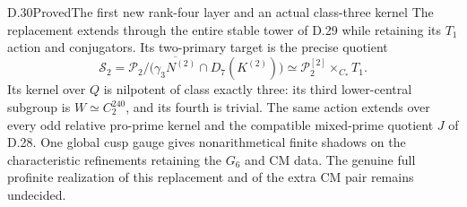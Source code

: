 \begin{statement}{D.30}{Proved}{The first new rank-four layer and an actual class-three kernel}
The replacement extends through the entire stable tower
of D.29 while retaining its $T_1$ action and conjugators.
Its two-primary target is the precise quotient
\[
 \mathcal S_2=
 \mathcal P_2/\bigl(
 \overline{\gamma_3N^{(2)}}\cap D_7(K^{(2)})\bigr)
 \simeq\mathcal P_2^{[2]}\times_{C_*}T_1.              \tag{D.30.5}
\]
Its kernel over $Q$ is nilpotent of class exactly three:
its third lower-central subgroup is $W\simeq C_2^{240}$,
and its fourth is trivial. The same action extends over
every odd relative pro-prime kernel and the compatible
mixed-prime quotient $J$ of D.28. One global cusp gauge
gives nonarithmetical finite shadows on the characteristic
refinements retaining the $G_6$ and CM data. The genuine
full profinite realization of this replacement and of
the extra CM pair remains undecided.
\end{statement}
